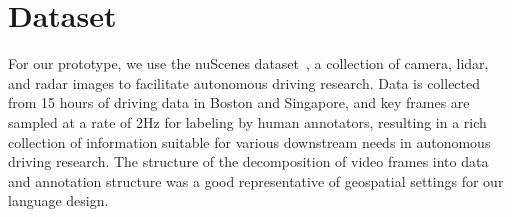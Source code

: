 
\section{Dataset}

For our prototype, we use the nuScenes dataset~\cite{ceasar:nuscenes}, a collection of camera, lidar, and radar images to facilitate autonomous driving research. Data is collected from 15 hours of driving data in Boston and Singapore, and key frames are sampled at a rate of 2Hz for labeling by human annotators, resulting in a rich collection of information suitable for various downstream needs in autonomous driving research. The structure of the decomposition of video frames into data and annotation structure was a good representative of geospatial settings for our language design.

